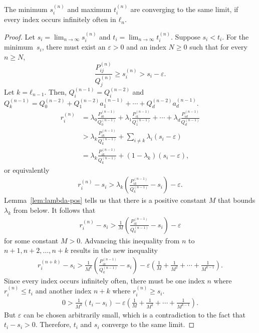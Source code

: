 \begin{lemma}
  \label{lem:min-max-conv}
  The minimum $s_i^{(n)}$ and maximum $t_i^{(n)}$ are converging to the same
  limit, if every index occurs infinitely often in $ℓ_n$.
\end{lemma}

\begin{proof}
  Let $s_i = \lim_{n → ∞} s_i^{(n)}$
  and $t_i = \lim_{n → ∞} t_i^{(n)}$.
  Suppose $s_i < t_i$.
  For the minimum~$s_i$, there must exist an $ε > 0$ and an index $N ≥ 0$ such
  that for every $n ≥ N$,
  \[
    \frac{P_{ij}^{(n)}}{Q_j^{(n)}} ≥ s_i^{(n)} > s_i - ε.
  \]
  Let $k = ℓ_{n-1}$.
  Then, $Q_i^{(n-1)} = Q_i^{(n-2)}$ and $Q_k^{(n-1)} = Q_0^{(n-2)} + Q_1^{(n-2)} a_1^{(n-1)} + ⋯ + Q_d^{(n-2)} a_d^{(n-1)}$.
  \begin{align*}
    r_i^{(n)}
    & = λ₀ \frac{P_{i0}^{(n-1)}}{Q_0^{(n-1)}} + λ₁ \frac{P_{i1}^{(n-1)}}{Q_1^{(n-1)}} + ⋯ + λ_d \frac{P_{id}^{(n-1)}}{Q_d^{(n-1)}} \\
    & > \lambda_k \frac{P_{ik}^{(n-1)}}{Q_k^{(n-1)}} + \sum_{i ≠ k} λ_i (s_i - ε) \\
    & = \lambda_k \frac{P_{ik}^{(n-1)}}{Q_k^{(n-1)}} + (1 - λ_k) (s_i - ε),
  \end{align*}
  or equivalently
  \begin{align*}
    r_i^{(n)} - s_i > λ_k \left( \frac{P_{ik}^{(n-1)}}{Q_k^{(n-1)}} - s_i \right) - ε.
  \end{align*}
  Lemma~\ref{lem:lambda-pos} tells us that there is a positive constant $M$
  that bounds $λ_k$ from below.
  It follows that
  \begin{align*}
    r_i^{(n)} - s_i > \frac{1}{M} \left( \frac{P_{ik}^{(n-1)}}{Q_k^{(n-1)}} - s_i \right) - ε
  \end{align*}
  for some constant $M > 0$.
  Advancing this inequality from $n$ to $n+1, n+2, …, n+k$ results in the new
  inequality
  \begin{align*}
    r_i^{(n+k)} - s_i > \frac{1}{M^k} \left( \frac{P_{ik}^{(n-1)}}{Q_k^{(n-1)}} - s_i \right) - ε\left( \frac{1}{M} + \frac{1}{M^2} + ⋯ + \frac{1}{M^{k-1}} \right).
  \end{align*}
  Since every index occurs infinitely often,
  there must be one index $n$ where $r_i^{(n)} ≤ t_i$
  and another index $n+k$ where $r_i^{(n)} ≥ s_i$.
  \begin{align*}
    0 > \frac{1}{M^k} \left( t_i - s_i \right) - ε\left( \frac{1}{M} + \frac{1}{M^2} + ⋯ + \frac{1}{M^{k-1}} \right).
  \end{align*}
  But $ε$ can be chosen arbitrarily small,
  which is a contradiction to the fact that $t_i - s_i > 0$.
  Therefore, $t_i$ and $s_i$ converge to the same limit.
\end{proof}

